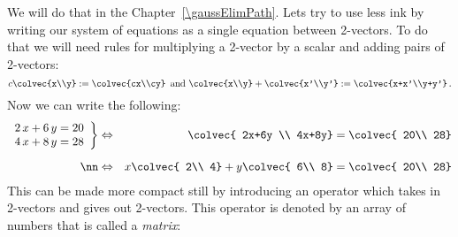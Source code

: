 %
We will do that in the Chapter~\ref{\gaussElimPath}. Lets try to use less ink by writing our system of  equations as a single equation between 2-vectors.
To do that we will need rules for multiplying a 2-vector by a scalar and adding pairs of 2-vectors:
\[
c\colvec{x\\y}:=\colvec{cx\\cy}\, \mbox{ and } \colvec{x\\y}+\colvec{x'\\y'}:=\colvec{x+x'\\y+y'}\, .
\]
Now we can write the following:
\begin{eqnarray*}
   \left.
\begin{array}{lr}
   	2\, x + 6\, y  =  20 \\
	4\, x + 8\, y  =  28
     \end{array}
   \right\} 
& \Leftrightarrow&    \colvec{ 2x+6y \\ 4x+8y}  =\colvec{ 20\\ 28}\\[2mm] \nn 
&\Leftrightarrow&
   x \colvec{ 2\\ 4} + y \colvec{ 6\\ 8} =\colvec{ 20\\ 28} 
\end{eqnarray*}
This can be made more compact still by introducing an operator which takes in 2-vectors and gives out 2-vectors. This operator is denoted by an array of numbers that  is called a {\it matrix}:

